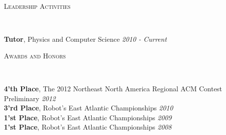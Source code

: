 \documentclass[9pt]{article}
\newenvironment{changemargin}[2]{%
  \begin{list}{}{%
    \setlength{\topsep}{0pt}%
    \setlength{\leftmargin}{#1}%
    \setlength{\rightmargin}{#2}%
    \setlength{\listparindent}{\parindent}%
    \setlength{\itemindent}{\parindent}%
    \setlength{\parsep}{\parskip}%
  }%
  \item[]}{\end{list}
}
\newcommand{\lineover}{
	\begin{changemargin}{-0.05in}{-0.05in}
		\vspace*{-8pt}
		\hrulefill \\
		\vspace*{-2pt}
	\end{changemargin}
}
\newcommand{\header}[1]{
	\begin{changemargin}{-0.5in}{-0.5in}
		\scshape{#1}\\
  	\lineover
	\end{changemargin}
}
\newenvironment{body} {
	\vspace*{-16pt}
	\begin{changemargin}{-0.25in}{-0.5in}
  }	
	{\end{changemargin}
}
\begin{document}
\smallskip


\header{Leadership Activities}

\begin{body}
	\vspace{14pt}
	
	\textbf{Tutor}, Physics and Computer Science \hfill{} \emph{2010 - Current}\\
\end{body}

\smallskip


\header{Awards and Honors}

\begin{body}
	\vspace{14pt}
	\textbf{4'th Place}, The 2012 Northeast North America Regional ACM Contest Preliminary \hfill{} \emph{2012}\\
	\smallskip
	\textbf{3'rd Place}, Robot's East Atlantic Championships \hfill{} \emph {2010}
	\\
	\smallskip
	\textbf{1'st Place}, Robot's East Atlantic Championships \hfill{} \emph {2009}
	\\
	\smallskip
	\textbf{1'st Place}, Robot's East Atlantic Championships \hfill{} \emph {2008}
\end{body}
\end{document}
